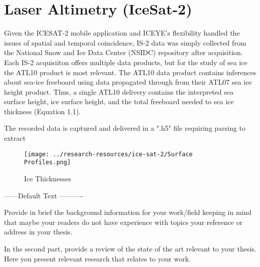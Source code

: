 \section {Laser Altimetry (IceSat-2)}
Given the ICESAT-2 mobile application and ICEYE's flexibility handled the issues of spatial and temporal coincidence, IS-2 data was simply collected from the National Snow and Ice Data Center (NSIDC) repository after acquisition. Each IS-2 acquisiiton offers multiple data products, but for the study of sea ice the ATL10 product is most relevant. The ATL10 data product contains inferences about sea-ice freeboard using data propagated through from their ATL07 sea ice height product. Thus, a single ATL10 delivery contains the interpreted sea surface height, ice surface height, and the total freeboard \cite{ICESat-2-ATL10-Product} needed to sea ice thickness (Equation 1.1).

The recorded data is captured and delivered in a ".h5" file requiring parsing to extract 


\begin{figure}[]
	\centering
	\texttt{[image: ../research-resources/ice-sat-2/Surface Profiles.png]}
	\caption{Ice Thicknesses}
	\label{fig:ice-thickness-gathered}
\end{figure}

------Default Text ----------

Provide in brief the background information for your work/field keeping in mind that maybe your readers do not have experience with topics your reference or address in your thesis. 

In the second part, provide a review of the state of the art relevant to your thesis. Here you present relevant research that relates to your work. 
